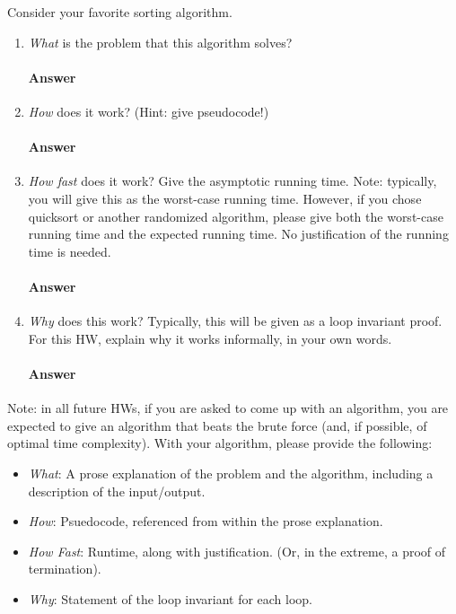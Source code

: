 \documentclass{article}
\begin{document}
\collab{\todo{}}
Consider your favorite sorting algorithm.
\begin{enumerate}
    \item \emph{What} is the problem that this algorithm solves?
          
          \paragraph{Answer}
          \todo{}
          
    \item \emph{How} does it work? (Hint: give pseudocode!)
          
          \paragraph{Answer}
          \todo{}
          
    \item \emph{How fast} does it work?  Give the asymptotic running time.
          Note: typically, you will give this as the worst-case running time.
          However, if you chose quicksort or another randomized algorithm, please
          give both the worst-case running time and the expected running time.  No
          justification of the running time is needed.
          
          \paragraph{Answer}
          \todo{}
          
    \item \emph{Why} does this work? Typically, this will be given as a loop
          invariant proof.  For this HW, explain why it works informally, in your
          own words.
          
          \paragraph{Answer}
          \todo{}
          
\end{enumerate}

Note: in all future HWs, if you are asked to come up with an algorithm, you are
expected to give an algorithm that beats the brute force (and, if possible, of
optimal time complexity). With your algorithm, please provide the following:
\begin{itemize}
    \item \emph{What}: A prose explanation of the problem and the algorithm,
          including a description of the input/output.
    \item \emph{How}: Psuedocode, referenced from within the prose explanation.
    \item \emph{How Fast}: Runtime, along with justification.  (Or, in the
          extreme, a proof of termination).
    \item \emph{Why}: Statement of the loop invariant for each loop.
\end{itemize}
\end{document}
